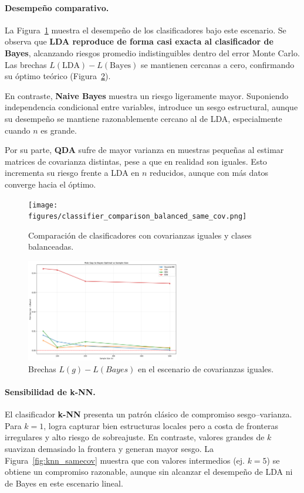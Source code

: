 \documentclass[10pt]{article}
\begin{document}
\paragraph{Desempeño comparativo.}
La Figura~\ref{fig:risk_samecov} muestra el desempeño de los clasificadores bajo este escenario. 
Se observa que \textbf{LDA reproduce de forma casi exacta al clasificador de Bayes}, alcanzando riesgos promedio indistinguibles dentro del error Monte Carlo. 
Las brechas $L(\text{LDA})-L(\text{Bayes})$ se mantienen cercanas a cero, confirmando su óptimo teórico (Figura~\ref{fig:riskgap_samecov}).  

En contraste, \textbf{Naive Bayes} muestra un riesgo ligeramente mayor. Suponiendo independencia condicional entre variables, 
introduce un sesgo estructural, aunque su desempeño se mantiene razonablemente cercano al de LDA, especialmente cuando $n$ es grande.  

Por su parte, \textbf{QDA} sufre de mayor varianza en muestras pequeñas al estimar matrices de covarianza distintas, 
pese a que en realidad son iguales. Esto incrementa su riesgo frente a LDA en $n$ reducidos, aunque con más datos converge hacia el óptimo.  

\begin{figure}[H]
    \centering
    \texttt{[image: figures/classifier\_comparison\_balanced\_same\_cov.png]}
    \caption{Comparación de clasificadores con covarianzas iguales y clases balanceadas.}
    \label{fig:risk_samecov}
\end{figure}

\begin{figure}[H]
    \centering
    \includegraphics[width=0.60\textwidth]{figures/risk_gaps.png}
    \caption{Brechas $L(g)-L(Bayes)$ en el escenario de covarianzas iguales.}
    \label{fig:riskgap_samecov}
\end{figure}

\paragraph{Sensibilidad de k-NN.}
El clasificador \textbf{k-NN} presenta un patrón clásico de compromiso sesgo–varianza. 
Para $k=1$, logra capturar bien estructuras locales pero a costa de fronteras irregulares y alto riesgo de sobreajuste. 
En contraste, valores grandes de $k$ suavizan demasiado la frontera y generan mayor sesgo. 
La Figura~\ref{fig:knn_samecov} muestra que con valores intermedios (ej. $k=5$) se obtiene un compromiso razonable, 
aunque sin alcanzar el desempeño de LDA ni de Bayes en este escenario lineal.
\end{document}
